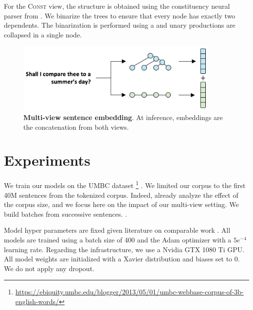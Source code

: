 For the \textsc{Const} view, the structure is obtained using the constituency neural parser from \textcite{klein_18}. We binarize the trees to ensure that every node has exactly two dependents. The binarization is performed using a  and unary productions are collapsed in a single node. 

\begin{figure}[!htb]
\begin{center}
\includegraphics[width=10cm]{images/contrastive-inf.png}
\end{center}
\caption{\textbf{Multi-view sentence embedding}. At inference, embeddings are the concatenation from both views.}
\end{figure}

\section{Experiments}

We train our models on the UMBC dataset \footnote{\url{https://ebiquity.umbc.edu/blogger/2013/05/01/umbc-webbase-corpus-of-3b-english-words/}} \parencite{han_13}. We limited our corpus to the first 40M sentences from the tokenized corpus. Indeed, \textcite{logeswaran_18} already analyze the effect of the corpus size, and we focus here on the impact of our multi-view setting. We build batches from successive sentences. . 

Model hyper parameters are fixed given literature on comparable work \parencite{tai_15, logeswaran_18}. All models are trained using a batch size of 400 and the Adam optimizer with a $5e^{-4}$ learning rate. Regarding the infrastructure, we use a Nvidia GTX 1080 Ti GPU. All model weights are initialized with a Xavier distribution and biases set to 0. We do not apply any dropout. 

